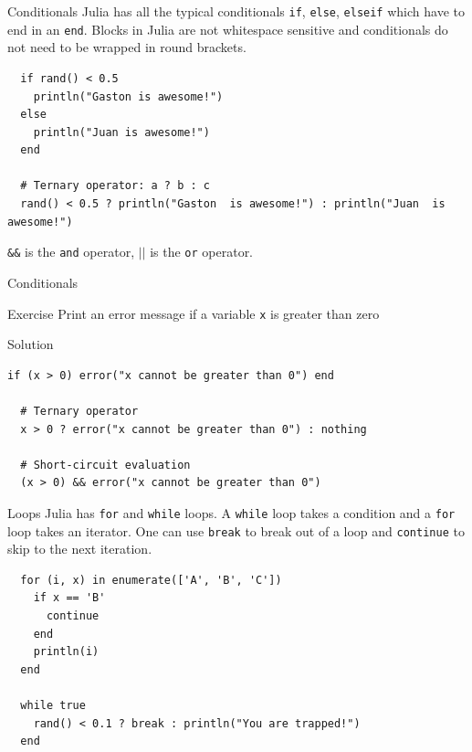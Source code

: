 \documentclass{beamer}
\begin{document}
\begin{frame}[fragile]{Conditionals}
  Julia has all the typical conditionals \verb|if|, \verb|else|, \verb|elseif| which have to end in an \verb|end|.
  Blocks in Julia are not whitespace sensitive and conditionals do not need to be wrapped in round brackets.
  \begin{lstlisting}
  if rand() < 0.5
    println("Gaston is awesome!")
  else
    println("Juan is awesome!")
  end
  
  # Ternary operator: a ? b : c
  rand() < 0.5 ? println("Gaston  is awesome!") : println("Juan  is awesome!")
\end{lstlisting}

\verb|&&| is the \verb|and| operator, $||$ is the \verb|or| operator.
\end{frame}


\begin{frame}[fragile]{Conditionals}
	\begin{block}{Exercise}
	Print an error message if a variable \verb|x| is greater than zero
	\end{block}
	\vfill
	\begin{block}{Solution}
		\begin{lstlisting}[mathescape]
  if (x > 0) error("x cannot be greater than 0") end
	
  # Ternary operator		
  x > 0 ? error("x cannot be greater than 0") : nothing
			
  # Short-circuit evaluation
  (x > 0) && error("x cannot be greater than 0")
		\end{lstlisting}
	\end{block}
\end{frame}

\begin{frame}[fragile]{Loops}
  Julia has \verb|for| and \verb|while| loops. A \verb|while| loop takes a condition and a \verb|for| loop takes an iterator.
  One can use \verb|break| to break out of a loop and \verb|continue| to skip to the next iteration. %
  \begin{lstlisting}
  for (i, x) in enumerate(['A', 'B', 'C'])
    if x == 'B'
      continue
    end
    println(i)
  end

  while true
    rand() < 0.1 ? break : println("You are trapped!")
  end
  \end{lstlisting}
\end{frame}
\end{document}
